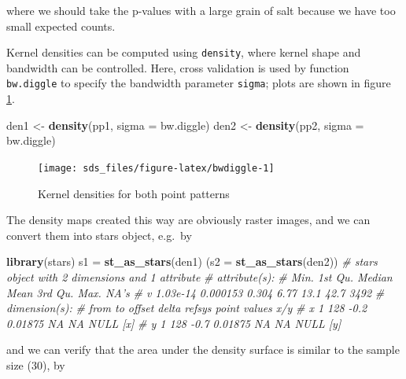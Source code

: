\documentclass[]{book}
\newenvironment{Shaded}{\begin{snugshade}}{\end{snugshade}}
\newcommand{\CommentTok}[1]{\textcolor[rgb]{0.56,0.35,0.01}{\textit{#1}}}
\newcommand{\DataTypeTok}[1]{\textcolor[rgb]{0.13,0.29,0.53}{#1}}
\newcommand{\DecValTok}[1]{\textcolor[rgb]{0.00,0.00,0.81}{#1}}
\newcommand{\KeywordTok}[1]{\textcolor[rgb]{0.13,0.29,0.53}{\textbf{#1}}}
\newcommand{\NormalTok}[1]{#1}
\newcommand{\OperatorTok}[1]{\textcolor[rgb]{0.81,0.36,0.00}{\textbf{#1}}}
\newcommand{\OtherTok}[1]{\textcolor[rgb]{0.56,0.35,0.01}{#1}}
\newcommand{\StringTok}[1]{\textcolor[rgb]{0.31,0.60,0.02}{#1}}
\begin{document}
where we should take the p-values with a large grain of salt because
we have too small expected counts.

Kernel densities can be computed using \texttt{density}, where kernel shape and
bandwidth can be controlled. Here, cross validation is used by function
\texttt{bw.diggle} to specify the bandwidth parameter \texttt{sigma}; plots are shown in
figure \ref{fig:bwdiggle}.

\begin{Shaded}
\begin{Highlighting}[]
\NormalTok{den1 <-}\StringTok{ }\KeywordTok{density}\NormalTok{(pp1, }\DataTypeTok{sigma =}\NormalTok{ bw.diggle)}
\NormalTok{den2 <-}\StringTok{ }\KeywordTok{density}\NormalTok{(pp2, }\DataTypeTok{sigma =}\NormalTok{ bw.diggle)}
\end{Highlighting}
\end{Shaded}

\begin{figure}

{\centering \texttt{[image: sds\_files/figure-latex/bwdiggle-1]} 

}

\caption{Kernel densities for both point patterns}\label{fig:bwdiggle}
\end{figure}

The density maps created this way are obviously raster images, and we can
convert them into stars object, e.g.~by

\begin{Shaded}
\begin{Highlighting}[]
\KeywordTok{library}\NormalTok{(stars)}
\NormalTok{s1 =}\StringTok{ }\KeywordTok{st_as_stars}\NormalTok{(den1)}
\NormalTok{(}\DataTypeTok{s2 =} \KeywordTok{st_as_stars}\NormalTok{(den2))}
\CommentTok{# stars object with 2 dimensions and 1 attribute}
\CommentTok{# attribute(s):}
\CommentTok{#        Min.  1st Qu. Median Mean 3rd Qu. Max. NA's}
\CommentTok{# v  1.03e-14 0.000153  0.304 6.77    13.1 42.7 3492}
\CommentTok{# dimension(s):}
\CommentTok{#   from  to offset   delta refsys point values x/y}
\CommentTok{# x    1 128   -0.2 0.01875     NA    NA   NULL [x]}
\CommentTok{# y    1 128   -0.7 0.01875     NA    NA   NULL [y]}
\end{Highlighting}
\end{Shaded}

and we can verify that the area under the density surface is similar
to the sample size (30), by

\begin{Shaded}
\end{Shaded}
\end{document}
